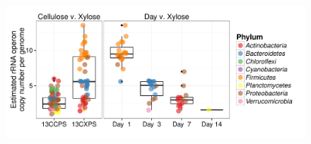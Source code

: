 \begin{figure}[H]
	\begin{center}
	\centerline{\includegraphics[width=\textwidth]{figures/copy_number/copy_number.pdf}}
	\caption{\protect}\label{fig:copy}
        \end{center}
\end{figure}

%
%
%
%
%
%
%

